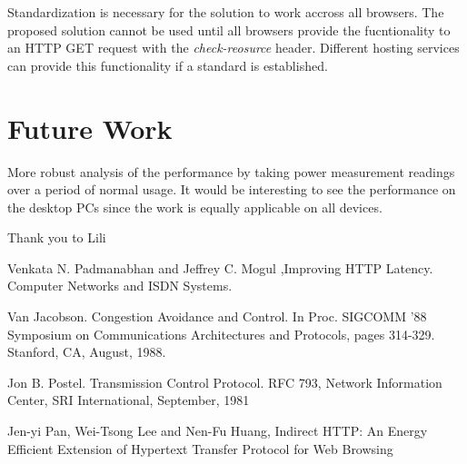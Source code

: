 \documentclass{sigplanconf}
\begin{document}
Standardization is necessary for the solution to work accross all browsers. The proposed solution cannot be used until all browsers provide the fucntionality to an HTTP GET request with the {\it check-reosurce} header. Different hosting services can provide this functionality if a standard is established.

\section{Future Work}

More robust analysis of the performance by taking power measurement readings over a period of normal usage. It would be interesting to see the performance on the desktop PCs since the work is equally applicable on all devices. 

\acks

Thank you to Lili





\begin{thebibliography}{}
\softraggedright

 Venkata N. Padmanabhan and Jeffrey C. Mogul ,Improving HTTP Latency. Computer Networks and ISDN Systems.

Van Jacobson. Congestion Avoidance and Control. In Proc. SIGCOMM ’88 Symposium on Communications Architectures and Protocols, pages 314-329. Stanford, CA, August, 1988.

Jon B. Postel. Transmission Control Protocol. RFC 793, Network Information Center, SRI International, September, 1981

Jen-yi Pan, Wei-Tsong Lee and Nen-Fu Huang, Indirect HTTP: An Energy Efficient Extension of Hypertext Transfer Protocol for Web Browsing

\end{thebibliography}
\end{document}
